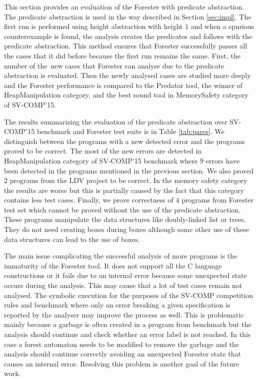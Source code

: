 This section provides an evaluation of the Forester with predicate abstraction.
The predicate abstraction is used in the way described in Section \ref{sec:impl}.
The first run is performed using height abstraction with height $1$ and when a spurious
counterexample is found, the analysis creates the predicates and follows with
the predicate abstraction.
This method ensures that Forester successfully passes all the cases that it did
before because the first run remains the same.
First, the number of the~new cases that Forester can analyse due to
the predicate abstraction is evaluated.
Then the newly analysed cases are studied more deeply and
the Forester performance is compared to the Predator tool, the winner of HeapManipulation category,
and the best sound tool in MemorySafety category of SV-COMP'15.

The results summarizing the evaluation of the predicate abstraction over SV-COMP'15
benchmark and Forester test suite is in Table \ref{tab:pares}.
We distinguish between the programs with a new detected error
and the programs proved to be correct.
The most of the new errors are detected in HeapManipulation category of SV-COMP'15
benchmark where $9$ errors have been detected in the programs
mentioned in the previous section.
We also proved $2$ programs from the LDV project to be correct.
In the memory safety category the results are worse but this is partially caused
by the fact that this category contains less test cases.
Finally, we prove correctness of $4$ programs from Forester test set
which cannot be proved without the use of the predicate abstraction.
These programs manipulate the data structures like doubly-linked list
or trees.
They do not need creating boxes during boxes although
some other use of these data structures can lead to the use of boxes.

The main issue complicating the successful analysis of
more programs is the immaturity of the Forester tool.
It does not support all the C language constructions
or it fails due to an internal error because some unexpected
state occurs during the analysis.
This may cause that a lot of test cases remain not analysed.
The symbolic execution for the purposes of the SV-COMP competition rules and benchmark
where only an error breaking a given specification is reported
by the analyser may improve the process as well.
This is problematic mainly because a garbage is often created
in a program from benchmark but the analysis should continue
and check whether an error label is not reached.
In this case a forest automaton needs to be modified
to remove the garbage and the analysis should continue correctly avoiding
an unexpected Forester state that causes an internal error.
Resolving this problem is another goal of the future work.

